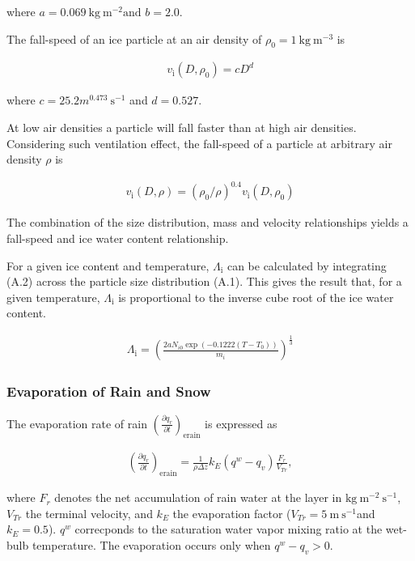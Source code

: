 where \(a=0.069 \mathrm{~kg} \mathrm{~m}^{-2} \text {and } b=2.0\).

The fall-speed of an ice particle at an air density of
\(\rho_{0} = 1\mathrm{~kg} \mathrm{~m}^{-3}\) is

\begin{eqnarray}
v_{\text {i}}(D,\rho_0)=c D^{d}
\label{WB99.A3}
\end{eqnarray}

where \(c=25.2 m^{0.473} \mathrm{~s}^{-1}\) and \(d=0.527 .\)

At low air densities a particle will fall faster than at high air
densities. Considering such ventilation effect, the fall-speed of a
particle at arbitrary air density \(\rho\) is

\begin{eqnarray}
v_{\text {i}}(D,\rho)=\left(\rho_{0} / \rho\right)^{0.4} v_{\text {i}}\left(D,\rho_{0}\right)
\label{WB99.A6}
\end{eqnarray}

The combination of the size distribution, mass and velocity
relationships yields a fall-speed and ice water content relationship.

For a given ice content and temperature, \(\Lambda_{\text {i}}\) can be
calculated by integrating (A.2) across the particle size distribution
(A.1). This gives the result that, for a given temperature,
\(\Lambda_{\text {i}}\) is proportional to the inverse cube root of the
ice water content.

\begin{eqnarray}
\Lambda_{\text {i}} = \left(\frac{2aN_{i0}\exp (-0.1222 (T-T_{0}))}{m_i}\right)^{\frac{1}{3}}
\end{eqnarray}

\hypertarget{evaporation-of-rain-and-snow}{%
\subsubsection{Evaporation of Rain and
Snow}\label{evaporation-of-rain-and-snow}}

The evaporation rate of rain
\(\left(\frac{\partial q_r}{\partial t}\right)_{\text {erain}}\) is
expressed as

\begin{eqnarray}
\left(\frac{\partial q_r}{\partial t}\right)_{\text {erain}}
=\frac{1}{\rho \Delta z}k_{E}\left(q^{w}-q_v\right) \frac{F_r}{V_{Tr}},
\end{eqnarray}

where \(F_r\) denotes the net accumulation of rain water at the layer in
\(\mathrm{kg} \mathrm{~m}^{-2} \mathrm{~s}^{-1}\), \(V_{Tr}\) the
terminal velocity, and \(k_E\) the evaporation factor
(\(V_{Tr} = 5\mathrm{~m} \mathrm{~s}^{-1}\)and \(k_E = 0.5\)). \(q^w\)
correcponds to the saturation water vapor mixing ratio at the wet-bulb
temperature. The evaporation occurs only when \(q^{w}-q_v>0\).

